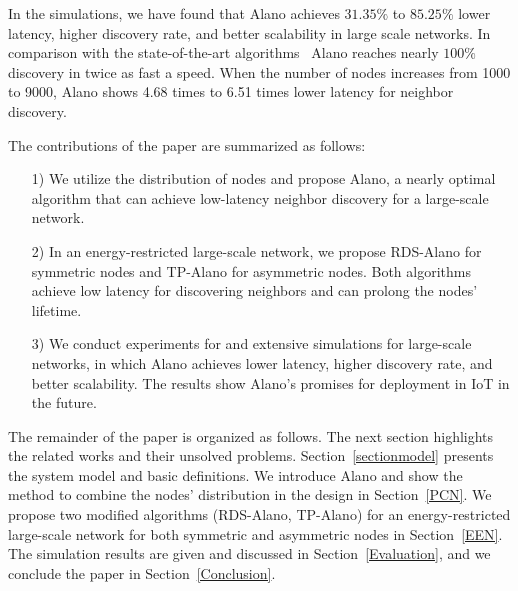 In the simulations, we have found that Alano achieves $31.35\%$ to $ 85.25\%$
lower latency, higher discovery rate, and better scalability in large
scale networks. %
In comparison with the state-of-the-art 
algorithms~\cite{you2011aloha, sun2014hello, chen2015heterogeneous, bakht2012searchlight}
Alano reaches nearly $100\%$ discovery in twice as fast a speed. 
When the number of nodes increases from 1000 to 9000, 
Alano shows 4.68 times to 6.51 times lower latency for neighbor discovery.

The contributions of the paper are summarized as follows:
\begin{itemize}
\item[1)] We utilize the distribution of nodes and propose Alano, a
nearly optimal algorithm that can achieve low-latency neighbor discovery
for a large-scale network.
\item[2)] In an energy-restricted large-scale network, we propose
RDS-Alano for symmetric nodes and TP-Alano for asymmetric nodes. Both
algorithms achieve low latency for discovering neighbors and can prolong
the nodes' lifetime.
\item[3)] We conduct experiments for %
and extensive simulations for large-scale networks, in which
Alano achieves lower latency, higher discovery rate, and better scalability.
The results show Alano's promises for deployment in
IoT in the future.
\end{itemize}

The remainder of the paper is organized as follows. The next section
highlights the related works and their unsolved problems.
Section~\ref{sectionmodel} presents
the system model and basic definitions.
We introduce Alano and show the
method to combine the nodes' distribution in the design
in Section~\ref{PCN}. We propose
two modified algorithms (RDS-Alano, TP-Alano) for an energy-restricted
large-scale network for both symmetric and asymmetric nodes in Section~\ref{EEN}. 
The simulation results are given and discussed in Section~\ref{Evaluation}, 
and we conclude the paper in Section~\ref{Conclusion}.
